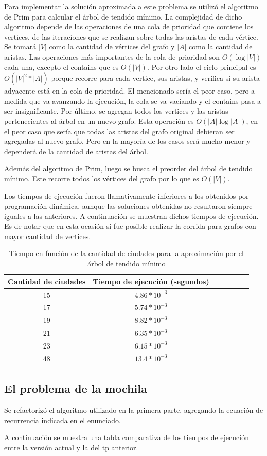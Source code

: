 \documentclass[a4paper,10pt]{article}
\begin{document}
Para implementar la solución aproximada a este problema se utilizó el algoritmo de Prim para calcular el árbol de tendido mínimo. La complejidad de dicho algoritmo depende de las operaciones de una cola de prioridad que contiene los vertices, de las iteraciones que se realizan sobre todas las aristas de cada vértice. Se tomará $|V|$ como la cantidad de vértices del grafo y $|A|$ como la cantidad de aristas. 
Las operaciones más importantes de la cola de prioridad son $O(\log{|V|})$ cada una, excepto el contains que es $O(|V|)$.
Por otro lado el ciclo principal es $O(|V|^2 *|A|)$ porque recorre para cada vertice, sus aristas, y verifica si su arista adyacente está en la cola de prioridad. El mencionado sería el peor caso, pero a medida que va avanzando la ejecución, la cola se va vaciando y el contains pasa a ser insignificante. Por último, se agregan todos los vertices y las aristas pertenecientes al árbol en un nuevo grafo. Esta operación es $O(|A| \log{|A|})$, en el peor caso que sería que todas las aristas del grafo original debieran ser agregadas al nuevo grafo. Pero en la mayoría de los casos será mucho menor y dependerá de la cantidad de aristas del árbol.

Además del algoritmo de Prim, luego se busca el preorder del árbol de tendido mínimo. Este recorre todos los vértices del grafo por lo que es $O(|V|)$.

Los tiempos de ejecución fueron llamativamente inferiores a los obtenidos por programación dinámica, aunque las soluciones obtenidas no resultaron siempre iguales a las anteriores. A continuación se muestran dichos tiempos de ejecución. Es de notar que en esta ocasión sí fue posible realizar la corrida para grafos con mayor cantidad de vertices.

\begin{table}[H]
\centering
\begin{tabular}{|c|c|c|c|c|c|c|}
\hline
Cantidad de ciudades	& Tiempo de ejecución (segundos)\\\hline
15						& $4.86 * 10^{-3}$\\\hline
17						& $5.74 * 10^{-3}$\\\hline
19						& $8.82 * 10^{-3}$\\\hline
21						& $6.35 * 10^{-3}$\\\hline
23						& $6.15 * 10^{-3}$\\\hline
48						& $13.4 * 10^{-3}$\\\hline
\end{tabular}
\caption{Tiempo en función de la cantidad de ciudades para la aproximación por el árbol de tendido mínimo}
\label{tab:held}
\end{table}

\subsection{El problema de la mochila}

Se refactorizó el algoritmo utilizado en la primera parte, agregando la ecuación de recurrencia indicada en el enunciado.

A continuación se muestra una tabla comparativa de los tiempos de ejecución entre la versión actual y la del tp anterior.
\end{document}
